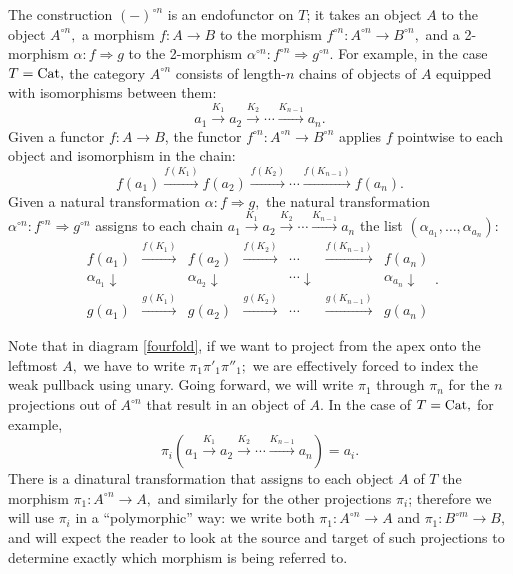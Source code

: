 \documentclass[12pt,twoside,openright]{report}
\newcommand{\Cat}{{\rm Cat}}
\newcommand{\maps}{\colon}
\begin{document}
The construction $(-)^{\circ n}$ is an endofunctor on $T$; it takes an object $A$ to the object $A^{\circ n},$ a morphism $f\maps A\to B$ to the morphism $f^{\circ n}\maps A^{\circ n}\to B^{\circ n},$ and a 2-morphism $\alpha\maps f\Rightarrow g$ to the 2-morphism $\alpha^{\circ n}\maps f^{\circ n} \Rightarrow g^{\circ n}.$  For example, in the case $T=\Cat,$ the category $A^{\circ n}$ consists of length-$n$ chains of objects of $A$ equipped with isomorphisms between them:
\[ a_1 \stackrel{K_1}{\to} a_2 \stackrel{K_2}{\to} \cdots \stackrel{K_{n-1}}{\to} a_n. \]
Given a functor $f\maps A \to B$, the functor $f^{\circ n}\maps A^{\circ n}\to B^{\circ n}$ applies $f$ pointwise to each object and isomorphism in the chain:
\[ f(a_1) \stackrel{f(K_1)}{\to} f(a_2) \stackrel{f(K_2)}{\to} \cdots \stackrel{f(K_{n-1})}{\to} f(a_n). \]
Given a natural transformation $\alpha\maps f\Rightarrow g,$ the natural transformation $\alpha^{\circ n}\maps f^{\circ n}\Rightarrow g^{\circ n}$ assigns to each chain $a_1 \stackrel{K_1}{\to} a_2 \stackrel{K_2}{\to} \cdots \stackrel{K_{n-1}}{\to} a_n$ the list $(\alpha_{a_1},\ldots,\alpha_{a_n})$:
\[
\begin{array}{ccccccc}
  f(a_1) & \stackrel{f(K_1)}{\to} & f(a_2) & \stackrel{f(K_2)}{\to} & \cdots & \stackrel{f(K_{n-1})}{\to} & f(a_n) \\
  \alpha_{a_1}\downarrow & & \alpha_{a_2}\downarrow & & \cdots \downarrow & & \alpha_{a_n}\downarrow \\
  g(a_1) & \stackrel{g(K_1)}{\to} & g(a_2) & \stackrel{g(K_2)}{\to} & \cdots & \stackrel{g(K_{n-1})}{\to} & g(a_n)
\end{array}.
\]

Note that in diagram \ref{fourfold}, if we want to project from the apex onto the leftmost $A,$ we have to write $\pi_1\pi'_1\pi''_1;$ we are effectively forced to index the weak pullback using unary.  Going forward, we will write $\pi_1$ through $\pi_n$ for the $n$ projections out of $A^{\circ n}$ that result in an object of $A$.  In the case of $T=\Cat,$ for example,
\[ \pi_i(a_1 \stackrel{K_1}{\to} a_2 \stackrel{K_2}{\to} \cdots \stackrel{K_{n-1}}{\to} a_n) = a_i. \]
There is a dinatural transformation that assigns to each object $A$ of $T$ the morphism $\pi_1\maps A^{\circ n} \to A,$ and similarly for the other projections $\pi_i$; therefore we will use $\pi_i$ in a ``polymorphic'' way: we write both $\pi_1\maps A^{\circ n} \to A$ and $\pi_1\maps B^{\circ m} \to B,$ and will expect the reader to look at the source and target of such projections to determine exactly which morphism is being referred to.
\end{document}
